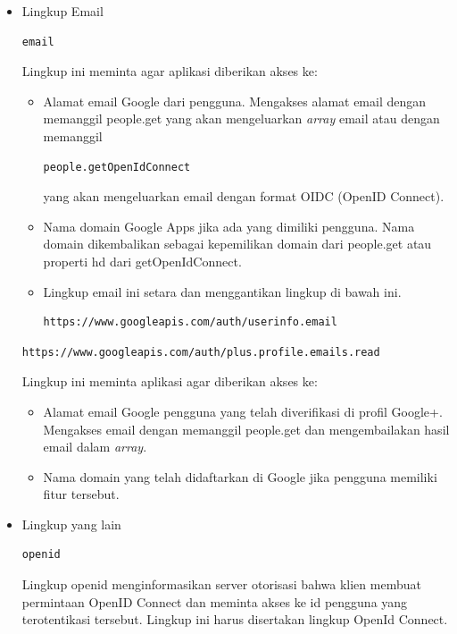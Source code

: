 \begin{itemize}
\item Lingkup Email\\
\begin{lstlisting}[basicstyle=\footnotesize]
email
\end{lstlisting}
Lingkup ini meminta agar aplikasi diberikan akses ke:
\begin{itemize}
\item
Alamat email Google dari pengguna. Mengakses alamat email dengan memanggil
people.get yang akan mengeluarkan {\it array} email atau dengan memanggil
\begin{lstlisting}[basicstyle=\footnotesize]
people.getOpenIdConnect
\end{lstlisting}
yang akan mengeluarkan email dengan format OIDC (OpenID Connect).
\item
Nama domain Google Apps jika ada yang dimiliki pengguna. Nama domain
dikembalikan sebagai kepemilikan domain dari people.get atau properti hd dari
getOpenIdConnect.
\item
Lingkup email ini setara dan menggantikan lingkup di bawah ini.
\begin{lstlisting}[basicstyle=\footnotesize]
https://www.googleapis.com/auth/userinfo.email
\end{lstlisting}
\end{itemize}
\begin{lstlisting}[basicstyle=\footnotesize]
https://www.googleapis.com/auth/plus.profile.emails.read
\end{lstlisting}
Lingkup ini meminta aplikasi agar diberikan akses ke:
\begin{itemize}
\item
Alamat email Google pengguna yang telah diverifikasi di profil Google+.
Mengakses email dengan memanggil people.get dan mengembailakan hasil email dalam
{\it array}.
\item
Nama domain yang telah didaftarkan di Google jika pengguna memiliki fitur
tersebut.
\end{itemize}

\item Lingkup yang lain\\
\begin{lstlisting}[basicstyle=\footnotesize]
openid
\end{lstlisting}
Lingkup openid menginformasikan server otorisasi bahwa klien membuat permintaan
OpenID Connect dan meminta akses ke id pengguna yang terotentikasi tersebut.
Lingkup ini harus disertakan lingkup OpenId Connect.


\end{itemize}
